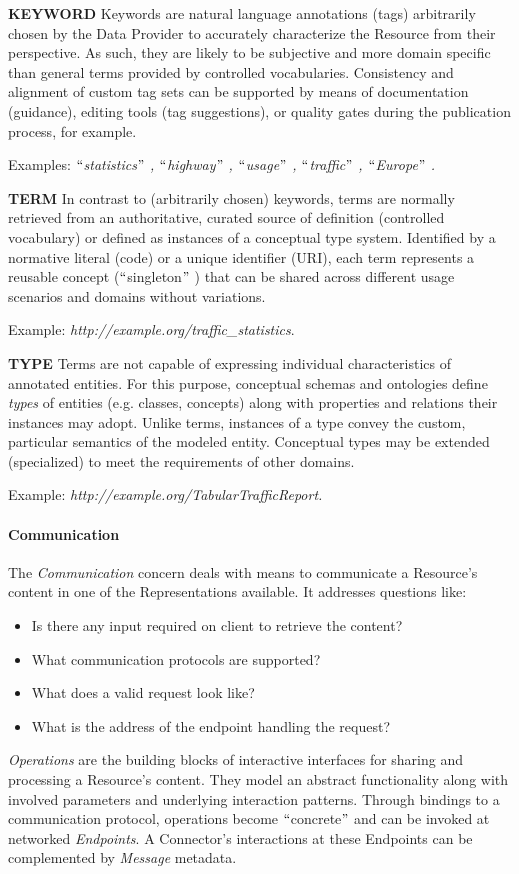 \textbf{KEYWORD} Keywords are natural language annotations (tags) arbitrarily chosen by the Data Provider to accurately characterize the Resource from their perspective. As such, they are likely to be subjective and more domain specific than general terms provided by controlled vocabularies. Consistency and alignment of custom tag sets can be supported by means of documentation (guidance), editing tools (tag suggestions), or quality gates during the publication process, for example. 

Examples: \textit{$``$statistics$"$ , $``$highway$"$ , $``$usage$"$ , $``$traffic$"$ , $``$Europe$"$ .}

\textbf{TERM} In contrast to (arbitrarily chosen) keywords, terms are normally retrieved from an authoritative, curated source of definition (controlled vocabulary) or defined as instances of a conceptual type system. Identified by a normative literal (code) or a unique identifier (URI), each term represents a reusable concept ($``$singleton$"$ ) that can be shared across different usage scenarios and domains without variations. 

Example: \textit{http://example.org/traffic\_statistics}. 

\textbf{TYPE} Terms are not capable of expressing individual characteristics of annotated entities. For this purpose, conceptual schemas and ontologies define \textit{types} of entities (e.g. classes, concepts) along with properties and relations their instances may adopt. Unlike terms, instances of a type convey the custom, particular semantics of the modeled entity. Conceptual types may be extended (specialized) to meet the requirements of other domains. 

Example: \textit{http://example.org/TabularTrafficReport.}\par

\paragraph{Communication\\}


The \textit{Communication }concern deals with means to communicate a Resource’s content in one of the Representations available. It addresses questions like:  \begin{itemize}
	\item Is there any input required on client to retrieve the content?  	
	\item What communication protocols are supported? 
 	\item What does a valid request look like? 
 	\item What is the address of the endpoint handling the request?
\end{itemize} 
 \textit{Operations} are the building blocks of interactive interfaces for sharing and processing a Resource’s content. They model an abstract functionality along with involved parameters and underlying interaction patterns. Through bindings to a communication protocol, operations become $``$concrete$"$  and can be invoked at networked \textit{Endpoints}. A Connector’s interactions at these Endpoints can be complemented by \textit{Message} metadata.


